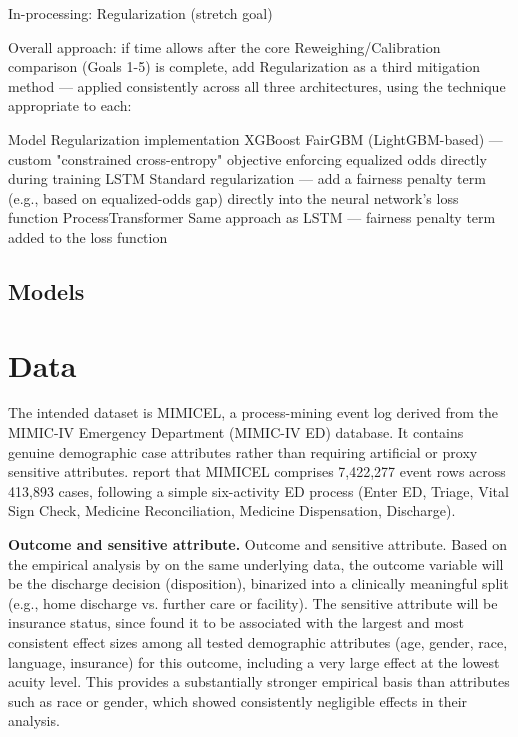 \documentclass[authoryear,preprint,12pt]{elsarticle}
\begin{document}
In-processing: Regularization (stretch goal)

Overall approach: if time allows after the core Reweighing/Calibration comparison (Goals 1-5) is complete, add Regularization as a third mitigation method — applied consistently across all three architectures, using the technique appropriate to each:

Model	Regularization implementation
XGBoost	FairGBM (LightGBM-based) — custom "constrained cross-entropy" objective enforcing equalized odds directly during training
LSTM	Standard regularization — add a fairness penalty term (e.g., based on equalized-odds gap) directly into the neural network's loss function
ProcessTransformer	Same approach as LSTM — fairness penalty term added to the loss function

\subsection{\textbf{Models}}



\section{Data}

The intended dataset is MIMICEL, a process-mining event log derived from the MIMIC-IV Emergency Department (MIMIC-IV ED) database. It contains genuine demographic case attributes rather than requiring artificial or proxy sensitive attributes. \citet{AndreswariMIMICEL} report that MIMICEL comprises 7,422,277 event rows across 413,893 cases, following a simple six-activity ED process (Enter ED, Triage, Vital Sign Check, Medicine Reconciliation, Medicine Dispensation, Discharge).

\textbf{Outcome and sensitive attribute.} Outcome and sensitive attribute. Based on the empirical analysis by \citet{AndreswariMIMICEL} on the same underlying data, the outcome variable will be the discharge decision (disposition), binarized into a clinically meaningful split (e.g., home discharge vs. further care or facility). The sensitive attribute will be insurance status, since \citet{AndreswariMIMICEL} found it to be associated with the largest and most consistent effect sizes among all tested demographic attributes (age, gender, race, language, insurance) for this outcome, including a very large effect at the lowest acuity level. This provides a substantially stronger empirical basis than attributes such as race or gender, which showed consistently negligible effects in their analysis.
\end{document}
